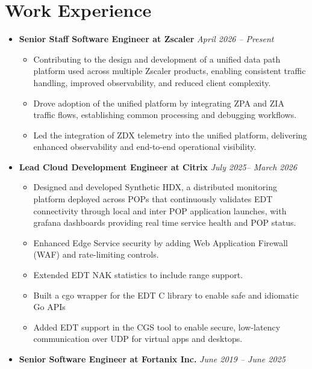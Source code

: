 \documentclass[12pt,a4paper]{article}
\begin{document}
\section*{Work Experience}
\vspace{-0.2cm}
\begin{itemize}[left=0em, label=]

\item \textbf{\large{Senior Staff Software Engineer at Zscaler}} \hfill\textit{April 2026 -- Present}
  \begin{itemize}[left=0.5em, label=\textbullet, leftmargin=*]
    \setlength\itemsep{0em}
    \item Contributing to the design and development of a unified data path platform used across multiple Zscaler products, enabling consistent traffic handling, improved observability, and reduced client complexity.
    \item Drove adoption of the unified platform by integrating ZPA and ZIA traffic flows, establishing common processing and debugging workflows.
    \item Led the integration of ZDX telemetry into the unified platform, delivering enhanced observability and end-to-end operational visibility.
  \end{itemize}

\item \textbf{\large{Lead Cloud Development Engineer at Citrix}} \hfill\textit{July 2025-- March 2026}
  \begin{itemize}[left=0.5em, label=\textbullet, leftmargin=*]
    \setlength\itemsep{0em}
    \item Designed and developed Synthetic HDX, a distributed monitoring platform deployed across POPs that continuously validates EDT connectivity through local and inter POP application launches, with grafana dashboards providing real time service health and POP status.
    \item Enhanced Edge Service security by adding Web Application Firewall (WAF) and rate-limiting controls.
    \item Extended EDT NAK statistics to include range support.
    \item Built a cgo wrapper for the EDT C library to enable safe and idiomatic Go APIs
     \item Added EDT support in the CGS tool to enable secure, low-latency communication over UDP for virtual apps and desktops.
  \end{itemize}

\item \textbf{\large{Senior Software Engineer at Fortanix Inc.}} \hfill\textit{June 2019 -- June 2025}
  \begin{itemize}[left=0.5em, label=\textbullet, leftmargin=*]
    \setlength\itemsep{0em}


\end{itemize}
\end{itemize}
\end{document}
